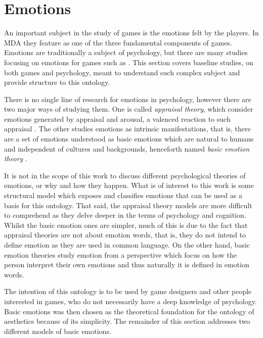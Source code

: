 \section{Emotions}
An important subject in the study of games is the emotions felt by the players. In MDA they feature as one of the three fundamental components of games. Emotions are traditionally a subject of psychology, but there are many studies focusing on emotions for games such as \cite{dillon_way_2010,bateman_implicit_2015,angelides_empirical_2014,karpouzis_emotion_2016}. This section covers baseline studies, on both games and psychology, meant to understand such complex subject and provide structure to this ontology.

There is no single line of research for emotions in psychology, however there are two major ways of studying them. One is called \textit{appraisal theory}, which consider emotions generated by appraisal and arousal, a valenced reaction to such appraisal \citep{ortony1990cognitive,scherer_appraisal_2001}. The other studies emotions as intrinsic manifestations, that is, there are a set of emotions understood as basic emotions which are natural to humans and independent of cultures and backgrounds, henceforth named \textit{basic emotion theory} \citep{ekman_are_basic_emotions_nodate,ekman_what_scientist_agree_2016}.

It is not in the scope of this work to discuss different psychological theories of emotions, or why and how they happen. What is of interest to this work is some structural model which exposes and classifies emotions that can be used as a basis for this ontology. That said, the appraisal theory models are more difficult to comprehend as they delve deeper in the terms of psychology and cognition. Whilst the basic emotion ones are simpler, much of this is due to the fact that appraisal theories are not about emotion words, that is, they do not intend to define emotion as they are used in common language. On the other hand, basic emotion theories study emotion from a perspective which focus on how the person interpret their own emotions and thus naturally it is defined in emotion words. 

The intention of this ontology is to be used by game designers and other people interested in games, who do not necessarily have a deep knowledge of psychology. Basic emotions was then chosen as the theoretical foundation for the ontology of aesthetics because of its simplicity. The remainder of this section addresses two different models of basic emotions.

